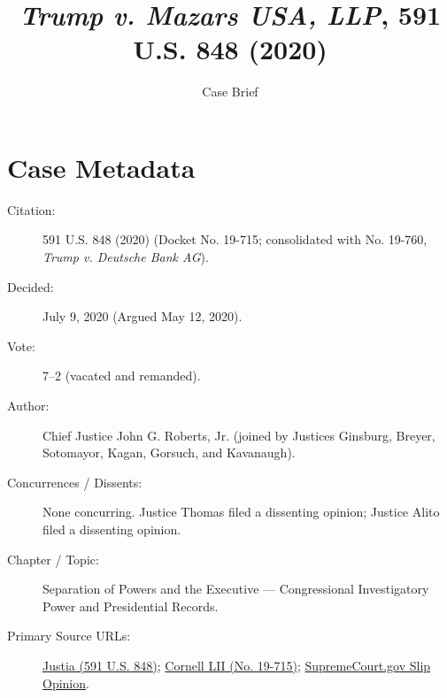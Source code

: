 \documentclass[12pt]{article}
\title{\textit{Trump v. Mazars USA, LLP}, 591 U.S. 848 (2020)}
\author{Case Brief}
\date{}
\begin{document}
\maketitle

\section{Case Metadata}
\begin{description}
  \item[Citation:] 591 U.S. 848 (2020) (Docket No. 19-715; consolidated with No. 19-760, \textit{Trump v. Deutsche Bank AG}).
  \item[Decided:] July 9, 2020 (Argued May 12, 2020).
  \item[Vote:] 7--2 (vacated and remanded).
  \item[Author:] Chief Justice John G. Roberts, Jr. (joined by Justices Ginsburg, Breyer, Sotomayor, Kagan, Gorsuch, and Kavanaugh).
  \item[Concurrences / Dissents:] None concurring. Justice Thomas filed a dissenting opinion; Justice Alito filed a dissenting opinion.
  \item[Chapter / Topic:] Separation of Powers and the Executive --- Congressional Investigatory Power and Presidential Records.
  \item[Primary Source URLs:] \href{https://supreme.justia.com/cases/federal/us/591/19-715/}{Justia (591 U.S. 848)}; \href{https://www.law.cornell.edu/supremecourt/text/19-715}{Cornell LII (No. 19-715)}; \href{https://www.supremecourt.gov/opinions/19pdf/19-715_febh.pdf}{SupremeCourt.gov Slip Opinion}.
\end{description}
\end{document}
